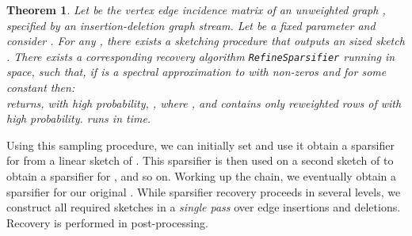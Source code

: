 \documentclass[11pt]{article}
\newtheorem{theorem}{Theorem}
\begin{document}
\begin{theorem}\label{refinement}
Let  be the vertex edge incidence matrix of an unweighted graph , specified by an insertion-deletion graph stream. Let  be a fixed parameter and consider . For any , there exists a sketching procedure  that outputs an  sized sketch . There exists a corresponding recovery algorithm \texttt{RefineSparsifier} running in  space, such that,
if  is a spectral approximation to  with  non-zeros and  for some constant  then:\\

  returns, with high probability, , where , and  contains only  reweighted rows of  with high probability.
 runs in  time.
\end{theorem}

Using this sampling procedure, we can initially set  and use it obtain a sparsifier for  from a linear sketch of . This sparsifier is then used on a second sketch of  to obtain a sparsifier for , and so on. Working up the chain, we eventually obtain a sparsifier for our original . While sparsifier recovery proceeds in several levels, we construct all required sketches in a \emph{single pass} over edge insertions and deletions. Recovery is performed in post-processing.
\end{document}
